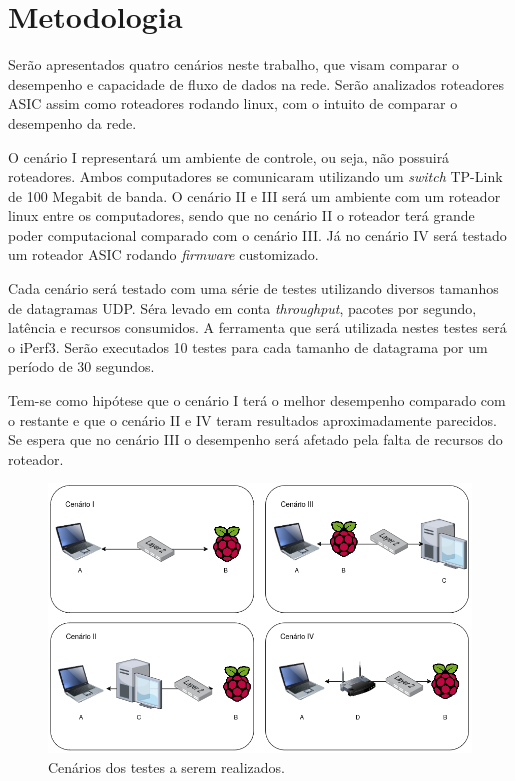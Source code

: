 \section{Metodologia} \label{Metodologia}
Serão apresentados quatro cenários neste trabalho, que visam comparar o desempenho e capacidade de fluxo de dados na rede. Serão analizados roteadores \ac{ASIC} assim como roteadores rodando linux, com o intuito de comparar o desempenho da rede. 

O cenário I representará um ambiente de controle, ou seja, não possuirá roteadores. Ambos computadores se comunicaram utilizando um \textit{switch} TP-Link de 100 Megabit de banda. O cenário II e III será um ambiente com um roteador linux entre os computadores, sendo que no cenário II o roteador terá grande poder computacional comparado com o cenário III. Já no cenário IV será testado um roteador \ac{ASIC} rodando \textit{firmware} customizado.

Cada cenário será testado com uma série de testes utilizando diversos tamanhos de datagramas UDP. Séra levado em conta \textit{throughput}, pacotes por segundo, latência e recursos consumidos. A ferramenta que será utilizada nestes testes será o iPerf3. Serão executados 10 testes para cada tamanho de datagrama por um período de 30 segundos.

Tem-se como hipótese que o cenário I terá o melhor desempenho comparado com o restante e que o cenário II e IV teram resultados aproximadamente parecidos. Se espera que no cenário III o desempenho será afetado pela falta de recursos do roteador.
\begin{figure}[H]
    \centering
    \includegraphics[width=0.9\linewidth]{sources/fig-cenarios.png}
    \caption{Cenários dos testes a serem realizados.}
    \label{fig:cenarios}
\end{figure}


